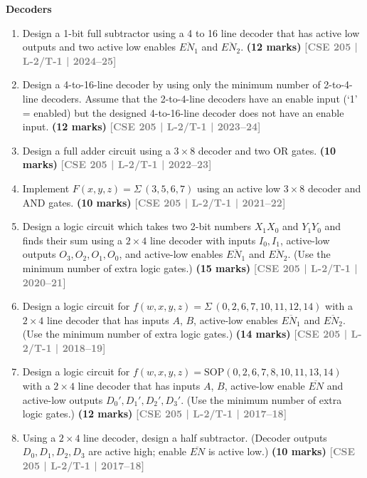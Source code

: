 \documentclass[12pt]{article}
\newcommand{\yr}[1]{\hfill\textcolor{gray}{\small\textbf{[#1]}}}
\newcommand{\mk}[1]{\textcolor{orange!70!black}{\small\textbf{(#1 marks)}}}
\newcounter{subtopicbm}
\newcommand{\subtopic}[2]{%
  \stepcounter{subtopicbm}%
  \pdfbookmark[2]{#2}{subtopicbm.\thesubtopicbm}%
  \vspace{10pt}
  \noindent\begin{tcolorbox}[colback=#1!8,colframe=#1,boxrule=0.6pt,arc=4pt,
    left=6pt,right=6pt,top=4pt,bottom=4pt]
    \small\bfseries\textcolor{#1}{#2}
  \end{tcolorbox}
  \vspace{2pt}
}
\begin{document}
\subtopic{cD}{Decoders}
\label{sub:s4-decoder-func}

\begin{enumerate}

\item Design a 1-bit full subtractor using a 4 to 16 line decoder that has active low outputs and two active low enables $\overline{EN_1}$ and $\overline{EN_2}$.
\mk{12} \yr{CSE 205 | L-2/T-1 | 2024--25}

\item Design a 4-to-16-line decoder by using only the minimum number of 2-to-4-line decoders. Assume that the 2-to-4-line decoders have an enable input (`1' = enabled) but the designed 4-to-16-line decoder does not have an enable input.
\mk{12} \yr{CSE 205 | L-2/T-1 | 2023--24}

\item Design a full adder circuit using a $3 \times 8$ decoder and two OR gates.
\mk{10} \yr{CSE 205 | L-2/T-1 | 2022--23}

\item Implement $F(x, y, z) = \Sigma\,(3, 5, 6, 7)$ using an active low $3 \times 8$ decoder and AND gates.
\mk{10} \yr{CSE 205 | L-2/T-1 | 2021--22}

\item Design a logic circuit which takes two 2-bit numbers $X_1X_0$ and $Y_1Y_0$ and finds their sum using a $2\times4$ line decoder with inputs $I_0, I_1$, active-low outputs $O_3, O_2, O_1, O_0$, and active-low enables $\overline{EN_1}$ and $\overline{EN_2}$. (Use the minimum number of extra logic gates.)
\mk{15} \yr{CSE 205 | L-2/T-1 | 2020--21}

\item Design a logic circuit for $f(w, x, y, z) = \Sigma\,(0, 2, 6, 7, 10, 11, 12, 14)$ with a $2\times4$ line decoder that has inputs $A$, $B$, active-low enables $\overline{EN_1}$ and $\overline{EN_2}$. (Use the minimum number of extra logic gates.)
\mk{14} \yr{CSE 205 | L-2/T-1 | 2018--19}

\item Design a logic circuit for $f(w, x, y, z) = \mathrm{SOP}(0, 2, 6, 7, 8, 10, 11, 13, 14)$ with a $2\times4$ line decoder that has inputs $A$, $B$, active-low enable $\overline{EN}$ and active-low outputs $D_0', D_1', D_2', D_3'$. (Use the minimum number of extra logic gates.)
\mk{12} \yr{CSE 205 | L-2/T-1 | 2017--18}

\item Using a $2 \times 4$ line decoder, design a half subtractor. (Decoder outputs $D_0, D_1, D_2, D_3$ are active high; enable $\overline{EN}$ is active low.)
\mk{10} \yr{CSE 205 | L-2/T-1 | 2017--18}


\end{enumerate}
\end{document}
